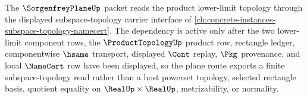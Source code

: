 The $\SorgenfreyPlaneUp$ packet reads the product lower-limit topology through the displayed subspace-topology carrier interface of \autoref{ch:concrete-instances-subspace-topology-namecert}. The dependency is active only after the two lower-limit component rows, the $\ProductTopologyUp$ product row, rectangle ledger, componentwise $\hsame$ transport, displayed $\Cont$ replay, $\Pkg$ provenance, and local $\NameCert$ row have been displayed, so the plane route exports a finite subspace-topology read rather than a host powerset topology, selected rectangle basis, quotient equality on $\RealUp \times \RealUp$, metrizability, or normality.
